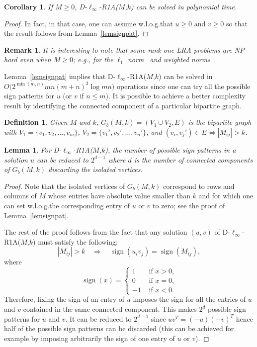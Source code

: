 \documentclass[a4paper,11pt]{article}
\newtheorem{corollary}{Corollary}
\newtheorem{definition}{Definition}
\newtheorem{lemma}{Lemma}
\newtheorem{remark}{Remark}
\numberwithin{equation}{section}
\DeclareMathOperator{\sign}{sign}
\begin{document}
\begin{corollary} \label{lemMnonneg}  
If $M \geq 0$,  D-$\ell_\infty$-R1A($M$,$k$) can be solved in polynomial time. 
\end{corollary} 
\begin{proof}
In fact, in that case, one can assume w.l.o.g.\@ that $u \geq 0$ and $v \geq 0$ so that the result follows from Lemma~\ref{lemsignpat}.  
\end{proof}

\begin{remark} 
It is interesting to note that some rank-one LRA problems are NP-hard even when $M \geq 0$; e.g., for the $\ell_1$ norm~\cite{GV15c} and weighted norms~\cite{GG10c}. 
\end{remark} 




Lemma~\ref{lemsignpat} implies that D-$\ell_\infty$-R1A($M$,$k$)  can be solved in $O\big( 2^{\min(m,n)} mn (m+n)^3 \log mn \big)$ operations since one can try all the possible sign patterns for $u$ (or $v$ if $n \leq m$). 
It is possible to achieve a better complexity result by identifying the connected component of a particular bipartite graph. 
\begin{definition}
Given $M$ and $k$, $G_b(M,k) = (V_1 \cup V_2, E)$ is the bipartite graph with 
$V_1 = \{v_1,v_2,\dots,v_m\}$, 
$V_2 = \{v_1',v_2',\dots,v_n'\}$, 
and 
$(v_i,v_j') \in E \iff |M_{ij}| > k$.  
\end{definition}


\begin{lemma} \label{lemconcomp} 
For D-$\ell_\infty$-R1A($M$,$k$), the number of possible sign patterns in a solution $u$ can be reduced to $2^{d-1}$ where $d$ is the number of connected components of $G_b(M,k)$ discarding the isolated vertices.  
\end{lemma}
\begin{proof} 
Note that the isolated vertices of $G_b(M,k)$ correspond to rows and columns of $M$ whose entries have absolute value smaller than $k$ and for which one can set w.l.o.g.\@ the corresponding entry of $u$ or $v$ to zero; see the proof of Lemma~\ref{lemsignpat}.  

The rest of the proof follows from the fact that any solution $(u,v)$ of D-$\ell_\infty$-R1A($M$,$k$) must satisfy the following:  
\[
|M_{ij}| > k \quad \Rightarrow \quad \sign(u_i v_j) = \sign(M_{ij}), 
\] 
where 
\[
\sign(x) = \left\{ 
\begin{array}{cc}
1 & \text{ if $x > 0$,} \\
0 & \text{ if $x = 0$,} \\
-1 & \text{ if $x < 0$.} 
\end{array}
\right. 
\]
Therefore, fixing the sign of an entry of $u$ imposes the sign for all the entries of $u$ and $v$ contained in the same connected component. This makes $2^{d}$ possible sign patterns for $u$ and $v$.  
It can be reduced to $2^{d-1}$ since $uv^T = (-u)(-v)^T$ hence half of the possible sign patterns can be discarded 
(this can be achieved for example by imposing arbitrarily the sign of one entry of $u$ or $v$).  
\end{proof}
\end{document}
